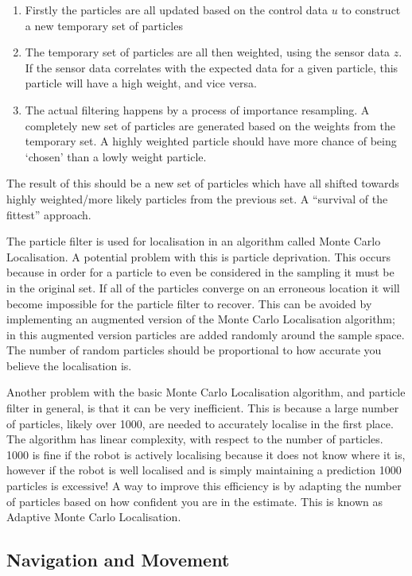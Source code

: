 \begin{enumerate}
\item Firstly the particles are all updated based on the control data $u$ to construct a new temporary set of particles
\item The temporary set of particles are all then weighted, using the sensor data $z$. If the sensor data correlates with the expected data for a given particle, this particle will have a high weight, and vice versa. 
\item The actual filtering happens by a process of importance resampling. A completely new set of particles are generated based on the weights from the temporary set. A highly weighted particle should have more chance of being ‘chosen’ than a lowly weight particle. 
\end{enumerate}

The result of this should be a new set of particles which have all shifted towards highly weighted/more likely particles from the previous set. A “survival of the fittest” approach.

The particle filter is used for localisation in an algorithm called Monte Carlo Localisation. A potential problem with this is particle deprivation. This occurs because in order for a particle to even be considered in the sampling it must be in the original set. If all of the particles converge on an erroneous location it will become impossible for the particle filter to recover. This can be avoided by implementing an augmented version of the Monte Carlo Localisation algorithm; in this augmented version particles are added randomly around the sample space. The number of random particles should be proportional to how accurate you believe the localisation is.

Another problem with the basic Monte Carlo Localisation algorithm, and particle filter in general, is that it can be very inefficient. This is because a large number of particles, likely over 1000, are needed to accurately localise in the first place. The algorithm has linear complexity, with respect to the number of particles.  1000 is fine if the robot is actively localising because it does not know where it is, however if the robot is well localised and is simply maintaining a prediction 1000 particles is excessive! A way to improve this efficiency is by adapting the number of particles based on how confident you are in the estimate. This is known as Adaptive Monte Carlo Localisation.

\subsection{Navigation and Movement}

